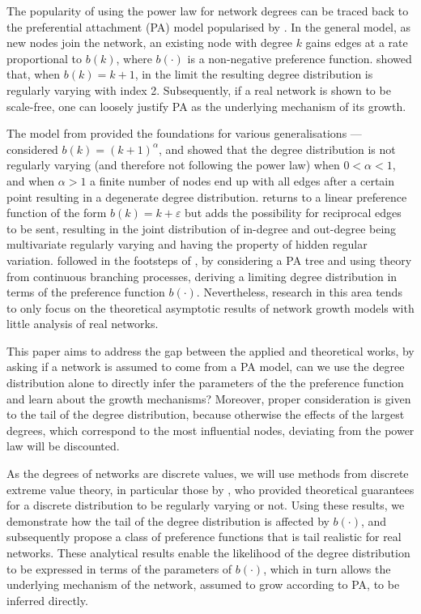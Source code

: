 \documentclass[
  sn-basic,
]{sn-jnl}
\theoremstyle{plain}
\theoremstyle{plain}
\theoremstyle{remark}
\begin{document}
The popularity of using the power law for network degrees can be traced
back to the preferential attachment (PA) model popularised by
\citet{Barabasi99}. In the general model, as new nodes join the network,
an existing node with degree \(k\) gains edges at a rate proportional to
\(b(k)\), where \(b(\cdot)\) is a non-negative preference function.
\citet{Barabasi99} showed that, when \(b(k) = k + 1\), in the limit the
resulting degree distribution is regularly varying with index 2.
Subsequently, if a real network is shown to be scale-free, one can
loosely justify PA as the underlying mechanism of its growth.

The model from \citet{Barabasi99} provided the foundations for various
generalisations --- \citet{krapivsky01} considered
\(b(k) = (k+1)^\alpha\), and showed that the degree distribution is not
regularly varying (and therefore not following the power law) when
\(0<\alpha<1\), and when \(\alpha>1\) a finite number of nodes end up
with all edges after a certain point resulting in a degenerate degree
distribution. \citet{wang2022random} returns to a linear preference
function of the form \(b(k) = k+\varepsilon\) but adds the possibility
for reciprocal edges to be sent, resulting in the joint distribution of
in-degree and out-degree being multivariate regularly varying and having
the property of hidden regular variation. \citet{rudas07} followed in
the footsteps of \citet{krapivsky01}, by considering a PA tree and using
theory from continuous branching processes, deriving a limiting degree
distribution in terms of the preference function \(b(\cdot)\).
Nevertheless, research in this area tends to only focus on the
theoretical asymptotic results of network growth models with little
analysis of real networks.

This paper aims to address the gap between the applied and theoretical
works, by asking if a network is assumed to come from a PA model, can we
use the degree distribution alone to directly infer the parameters of
the the preference function and learn about the growth mechanisms?
Moreover, proper consideration is given to the tail of the degree
distribution, because otherwise the effects of the largest degrees,
which correspond to the most influential nodes, deviating from the power
law will be discounted.

As the degrees of networks are discrete values, we will use methods from
discrete extreme value theory, in particular those by \citet{shimura12},
who provided theoretical guarantees for a discrete distribution to be
regularly varying or not. Using these results, we demonstrate how the
tail of the degree distribution is affected by \(b(\cdot)\), and
subsequently propose a class of preference functions that is tail
realistic for real networks. These analytical results enable the
likelihood of the degree distribution to be expressed in terms of the
parameters of \(b(\cdot)\), which in turn allows the underlying
mechanism of the network, assumed to grow according to PA, to be
inferred directly.
\end{document}
